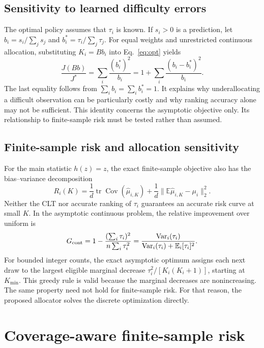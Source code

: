 \documentclass[10pt,letterpaper]{article}
\newcommand{\E}{\mathbb E}
\newcommand{\norm}[1]{\lVert #1\rVert_2}
\begin{document}
\subsection{Sensitivity to learned difficulty errors}
The optimal policy assumes that $\tau_i$ is known. If $s_i>0$ is a prediction, let $b_i=s_i/\sum_j s_j$ and $b_i^*=\tau_i/\sum_j\tau_j$. For equal weights and unrestricted continuous allocation, substituting $K_i=Bb_i$ into Eq.~\eqref{eq:opt} yields
\begin{equation}
 \frac{J(Bb)}{J^*}=\sum_i\frac{(b_i^*)^2}{b_i}=1+\sum_i\frac{(b_i-b_i^*)^2}{b_i}.
 \label{eq:regret}
\end{equation}
The last equality follows from $\sum_i b_i=\sum_i b_i^*=1$. It explains why underallocating a difficult observation can be particularly costly and why ranking accuracy alone may not be sufficient. This identity concerns the asymptotic objective only. Its relationship to finite-sample risk must be tested rather than assumed.


\subsection{Finite-sample risk and allocation sensitivity}
For the main statistic $h(z)=z$, the exact finite-sample objective also has the bias--variance decomposition
\begin{equation}
 R_i(K)=\frac1d\operatorname{tr}\operatorname{Cov}(\widehat\mu_{i,K})+\frac1d\norm{\E\widehat\mu_{i,K}-\mu_i}^2.
\end{equation}
Neither the CLT nor accurate ranking of $\tau_i$ guarantees an accurate risk curve at small $K$. In the asymptotic continuous problem, the relative improvement over uniform is
\begin{equation}
 G_{\rm cont}=1-\frac{(\sum_i\tau_i)^2}{n\sum_i\tau_i^2}=\frac{\operatorname{Var}_i(\tau_i)}{\operatorname{Var}_i(\tau_i)+\E_i[\tau_i]^2}.
\end{equation}
For bounded integer counts, the exact asymptotic optimum assigns each next draw to the largest eligible marginal decrease $\tau_i^2/[K_i(K_i+1)]$, starting at $K_{\min}$. This greedy rule is valid because the marginal decreases are nonincreasing. The same property need not hold for finite-sample risk. For that reason, the proposed allocator solves the discrete optimization directly.

\section{Coverage-aware finite-sample risk}\label{sec:coverage}
\end{document}
